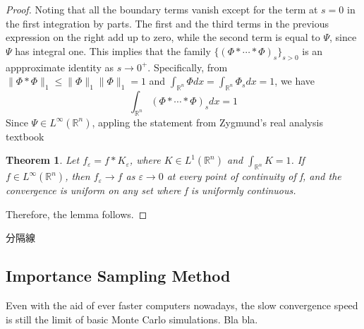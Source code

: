 \documentclass[12pt]{article}  %
\numberwithin{equation}{subsection}
\newtheorem{thm}{Theorem}[section]  %
\newtheorem{alg}{Algorithm}[section]  %
\theoremstyle{plain}
\begin{document}
\begin{proof}
	Noting that all the boundary terms vanish except for the term at $s = 0$ in the first integration by parts. The first and the third terms in the previous expression on the right add up to zero, while the second term is equal to $\varPsi$, since $\varPsi$ has integral one. This implies that the family $\{(\varPhi*\cdots*\varPhi)_s\}_{s>0}$ is an appproximate identity as $s \rightarrow 0^+$. Specifically, from $\|\varPhi*\varPhi\|_1 \le \|\varPhi\|_1\|\varPhi\|_1 = 1$ and $\int_{\mathbb{R}^n}\varPhi dx = \int_{\mathbb{R}^n}\varPhi_s dx = 1$, we have
	$$	
	\int_{\mathbb{R}^n}(\varPhi*\cdots*\varPhi)_s dx = 1
	$$
	Since $\varPsi \in L^{\infty}(\mathbb{R}^n)$, appling the statement from Zygmund's real analysis textbook
	\begin{thm}
		Let $f_{\varepsilon} = f*K_{\varepsilon}$, where $K\in L^1(\mathbb{R}^n)$ and $\int_{\mathbb{R}^n}K = 1$. If $f \in L^{\infty}(\mathbb{R}^n)$, then $f_{\varepsilon}\rightarrow f$ as $\varepsilon \rightarrow 0$ at every point of continuity of f, and the convergence is uniform on any set where f is uniformly continuous.
	\end{thm}
	Therefore, the lemma follows.
\end{proof}
分隔線








\subsection{Importance Sampling Method}
Even with the aid of ever faster computers nowadays, the slow convergence speed is still the limit of basic Monte Carlo simulations. Bla bla.
\end{document}
